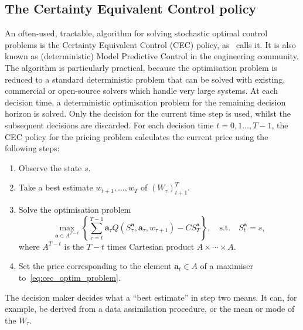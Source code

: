 \documentclass[main.tex]{subfiles}
\begin{document}
\subsection{The Certainty Equivalent Control policy}
An often-used, tractable, algorithm for solving stochastic optimal control
problems is the Certainty Equivalent Control (CEC) policy,
as~\citet{bertsekas2005dynamic} calls it.
It is also known as (deterministic) Model
Predictive Control in the engineering community.
The algorithm is particularly practical, because the optimisation
problem is reduced to a standard deterministic problem that can
be solved with existing, commercial or open-source solvers which
handle very large systems.
At each decision time, a deterministic optimisation problem for the
remaining decision horizon is solved. Only the decision for the
current time step is
used, whilst the subsequent decisions are discarded.
For each decision time $t=0,1\dots,T-1$, the CEC policy for the pricing
problem calculates the current price using the following steps:
\begin{enumerate}
\item Observe the state $s$.
\item Take a best estimate $w_{t+1},\dots,w_T$ of ${(W_\tau)}_{t+1}^T$.
\item Solve the optimisation problem
  \begin{equation}\label{eq:cec_optim_problem}
    \max_{\mathbf a\in A^{T-t}}\left\{\sum_{\tau=t}^{T-1}\mathbf
      a_\tau Q(S_\tau^{\mathbf a},\mathbf
      a_\tau,w_{\tau+1})-CS_T^{\mathbf a}\right\},
    \quad \text{s.t.}\quad S_t^{\mathbf a}=s,
  \end{equation}
  where $A^{T-t}$ is the $T-t$ times Cartesian product $A\times
  \cdots\times A$.
\item Set the price corresponding to the element
  $\mathbf{a}_t\in A$ of a maximiser to~\eqref{eq:cec_optim_problem}.
\end{enumerate}
The decision maker decides what a ``best estimate'' in step two
means. It can, for example, be
derived from a data assimilation procedure, or the
mean or mode of the $W_\tau$.
\end{document}
